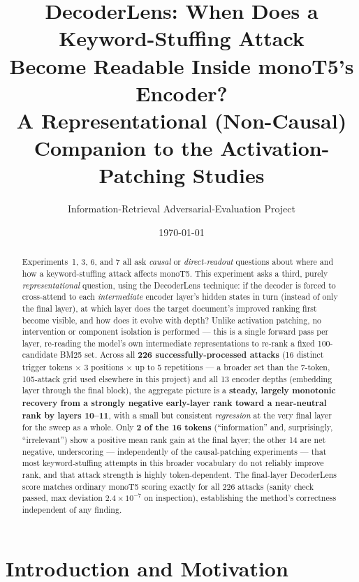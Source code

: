\documentclass[11pt]{article}
\title{\textbf{DecoderLens: When Does a Keyword-Stuffing Attack \\[2pt]
Become Readable Inside monoT5's Encoder?} \\[6pt]
\large A Representational (Non-Causal) Companion to the Activation-Patching Studies}
\author{Information-Retrieval Adversarial-Evaluation Project}
\date{\today}
\begin{document}
\maketitle

\begin{abstract}
Experiments~1, 3, 6, and 7 all ask \emph{causal} or \emph{direct-readout}
questions about where and how a keyword-stuffing attack affects monoT5.
This experiment asks a third, purely \emph{representational} question,
using the DecoderLens technique: if the decoder is forced to cross-attend
to each \emph{intermediate} encoder layer's hidden states in turn (instead
of only the final layer), at which layer does the target document's
improved ranking first become visible, and how does it evolve with depth?
Unlike activation patching, no intervention or component isolation is
performed — this is a single forward pass per layer, re-reading the
model's own intermediate representations to re-rank a fixed 100-candidate
BM25 set. Across all \textbf{226 successfully-processed attacks} (16
distinct trigger tokens $\times$ 3 positions $\times$ up to 5 repetitions —
a broader set than the 7-token, 105-attack grid used elsewhere in this
project) and all 13 encoder depths (embedding layer through the final
block), the aggregate picture is a \textbf{steady, largely monotonic
recovery from a strongly negative early-layer rank toward a near-neutral
rank by layers 10--11}, with a small but consistent \emph{regression} at
the very final layer for the sweep as a whole. Only \textbf{2 of the 16
tokens} (``information'' and, surprisingly, ``irrelevant'') show a
positive mean rank gain at the final layer; the other 14 are net negative,
underscoring — independently of the causal-patching experiments — that
most keyword-stuffing attempts in this broader vocabulary do not reliably
improve rank, and that attack strength is highly token-dependent. The
final-layer DecoderLens score matches ordinary monoT5 scoring exactly for
all 226 attacks (sanity check passed, max deviation $2.4\times10^{-7}$ on
inspection), establishing the method's correctness independent of any
finding.
\end{abstract}

\tableofcontents
\newpage

\section{Introduction and Motivation}
\end{document}

